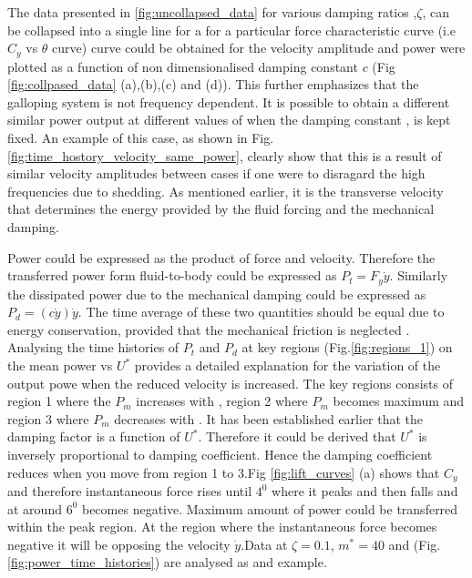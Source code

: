  The data presented in \ref{fig:uncollapsed_data} for various damping ratios ,$\zeta$, can be collapsed into a single line for a for a particular force characteristic curve (i.e $C_y$ vs $\theta$ curve)  curve could be obtained for the velocity amplitude  and power were plotted as a function of  non dimensionalised  damping constant $c$ 
(Fig \ref{fig:collpased_data} (a),(b),(c) and (d)).  This further emphasizes that the galloping system is not frequency dependent. It is possible to obtain a different similar power output at different values of \ustar when the damping constant , is kept fixed. An example of this case, as shown in Fig.\ref{fig:time_hostory_velocity_same_power}, clearly show that this is a result of similar velocity amplitudes between cases if one were to disragard the high frequencies due to shedding. As mentioned earlier, it is the transverse velocity that determines the energy provided by the fluid forcing and the mechanical damping.


 



 
 Power could be expressed as the product of force and velocity. Therefore the transferred power form fluid-to-body could be expressed as $P_t=F_y\dot{y}$. Similarly the dissipated power due to the mechanical damping could be expressed as $P_d=(c\dot{y})\dot{y}$. The time average of these two quantities should be equal due to energy conservation, provided that the mechanical friction is neglected . Analysing the  time histories of $P_t $ and $P_d$ at key regions (Fig.\ref{fig:regions_1}) on the mean power vs $U^*$ provides a detailed explanation for the variation of the output powe when the reduced velocity is increased. The key regions consists of region 1 where the $P_m$ increases with \ustar, region 2 where $P_m$ becomes maximum and region 3 where $P_m$ decreases with \ustar. It has been established earlier that the damping factor is a function of $U^*$. Therefore it could be derived that $U^*$ is inversely proportional to damping coefficient. Hence the damping coefficient reduces when you move from region 1 to 3.Fig \ref{fig:lift_curves} (a) shows that $C_y$ and therefore instantaneous force rises until $4^0$ where it peaks and then falls and at around $6^0$ becomes negative. Maximum amount of power could be transferred within the peak region. At the region where the instantaneous force becomes negative it will be opposing the velocity $\dot{y}$.Data at $\zeta=0.1$, $m^*=40$ and  (Fig.\ref{fig:power_time_histories}) are analysed as and example.  

